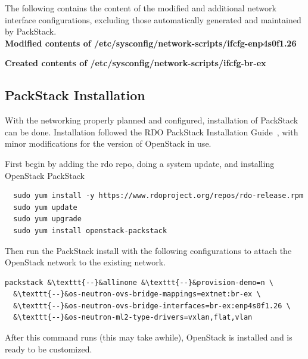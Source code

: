 The following contains the content of the modified and additional
network interface configurations, excluding those automatically
generated and maintained by PackStack.\\
\textbf{Modified contents of /etc/sysconfig/network-scripts/ifcfg-enp4s0f1.26}

\textbf{Created contents of /etc/sysconfig/network-scripts/ifcfg-br-ex}



\subsection{PackStack Installation}
\label{host-packstack-install}

With the networking properly planned and configured, installation of
PackStack can be done. Installation followed the RDO PackStack
Installation Guide~\cite{PackStacksetup}, with minor modifications for
the version of OpenStack in use.

First begin by adding the rdo repo, doing a system update, and
installing OpenStack PackStack
\begin{lstlisting}
  sudo yum install -y https://www.rdoproject.org/repos/rdo-release.rpm
  sudo yum update
  sudo yum upgrade
  sudo yum install openstack-packstack
\end{lstlisting}

Then run the PackStack install with the following configurations to
attach the OpenStack network to the existing network.
\begin{lstlisting}[escapechar=&]
  packstack &\texttt{--}&allinone &\texttt{--}&provision-demo=n \
  &\texttt{--}&os-neutron-ovs-bridge-mappings=extnet:br-ex \
  &\texttt{--}&os-neutron-ovs-bridge-interfaces=br-ex:enp4s0f1.26 \
  &\texttt{--}&os-neutron-ml2-type-drivers=vxlan,flat,vlan
\end{lstlisting}

After this command runs (this may take awhile), OpenStack is installed
and is ready to be customized.
